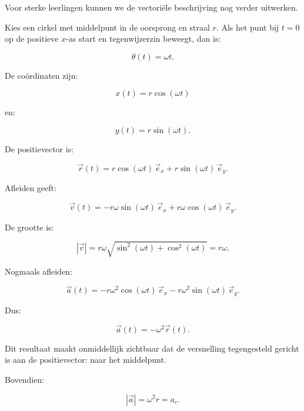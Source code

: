 \documentclass{ximera}
\begin{document}


Voor sterke leerlingen kunnen we de vectoriële beschrijving nog verder
uitwerken.

Kies een cirkel met middelpunt in de oorsprong en straal $r$. Als het
punt bij $t=0$ op de positieve $x$-as start en tegenwijzerzin beweegt,
dan is:

\[
\theta(t)=\omega t.
\]

De coördinaten zijn:

\[
\boxed{
x(t)=r\cos(\omega t)
}
\]

en:

\[
\boxed{
y(t)=r\sin(\omega t).
}
\]

De positievector is:

\[
\boxed{
\vec r(t)
=
r\cos(\omega t)\,\vec e_x
+
r\sin(\omega t)\,\vec e_y.
}
\]

Afleiden geeft:

\[
\vec v(t)
=
-r\omega\sin(\omega t)\,\vec e_x
+
r\omega\cos(\omega t)\,\vec e_y.
\]

De grootte is:

\[
|\vec v|
=
r\omega
\sqrt{\sin^2(\omega t)+\cos^2(\omega t)}
=
r\omega.
\]

Nogmaals afleiden:

\[
\vec a(t)
=
-r\omega^2\cos(\omega t)\,\vec e_x
-
r\omega^2\sin(\omega t)\,\vec e_y.
\]

Dus:

\[
\boxed{
\vec a(t)=-\omega^2\vec r(t).
}
\]

Dit resultaat maakt onmiddellijk zichtbaar dat de versnelling tegengesteld
gericht is aan de positievector: naar het middelpunt.

Bovendien:

\[
|\vec a|
=
\omega^2r
=
a_c.
\]
\end{document}
